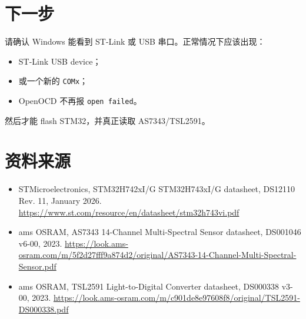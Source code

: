 \documentclass[11pt,a4paper]{ctexart}
\begin{document}
\section{下一步}

请确认 Windows 能看到 ST-Link 或 USB 串口。正常情况下应该出现：

\begin{itemize}
  \item ST-Link USB device；
  \item 或一个新的 \texttt{COMx}；
  \item OpenOCD 不再报 \texttt{open failed}。
\end{itemize}

然后才能 flash STM32，并真正读取 AS7343/TSL2591。

\section{资料来源}

\begin{itemize}
  \item STMicroelectronics, STM32H742xI/G STM32H743xI/G datasheet, DS12110 Rev. 11, January 2026. \url{https://www.st.com/resource/en/datasheet/stm32h743vi.pdf}
  \item ams OSRAM, AS7343 14-Channel Multi-Spectral Sensor datasheet, DS001046 v6-00, 2023. \url{https://look.ams-osram.com/m/5f2d27fff9a874d2/original/AS7343-14-Channel-Multi-Spectral-Sensor.pdf}
  \item ams OSRAM, TSL2591 Light-to-Digital Converter datasheet, DS000338 v3-00, 2023. \url{https://look.ams-osram.com/m/c901de8e97608f8/original/TSL2591-DS000338.pdf}
\end{itemize}
\end{document}
